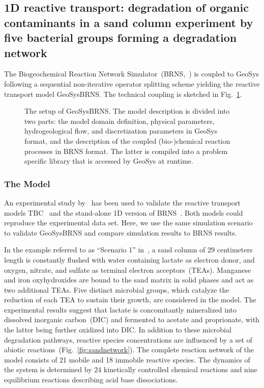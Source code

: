 \subsection[Degradation network (1D)]{1D reactive transport: degradation of organic contaminants in a
sand column experiment by five bacterial groups forming a degradation network}
\label{l_s_benchmark_1d_network}


The Biogeochemical Reaction Network
Simulator~(BRNS,~\cite{Aguilera2005,Regnier2002}) is coupled to GeoSys
following a sequential non-iterative operator splitting scheme yielding the
reactive transport model GeoSysBRNS. The technical
coupling is sketched in Fig.~\ref{fig:GeoSysBRNSSetup}.

\begin{figure}[h!]
\centering
{}
\caption{
The setup of GeoSysBRNS. The model description is divided into two parts: the
model domain definition, physical parameters, hydrogeological flow, and
discretization parameters in GeoSys format, and the description of the coupled
(bio-)chemical reaction processes in BRNS format. The latter is compiled into a
problem specific library that is accessed by GeoSys at runtime.
}
\label{fig:GeoSysBRNSSetup}
\end{figure}

\subsubsection*{The Model}

An experimental study by~\cite{Gunten1993} has been used to validate the
reactive transport models TBC~\cite{Schaefer1998b} and the stand-alone 1D
version of BRNS~\cite{Thullner2005}.  Both models could reproduce the
experimental data set. Here, we use the same simulation scenario to validate
GeoSysBRNS and compare simulation results to BRNS results.

In the example referred to as ``Scenario 1'' in~\cite{Thullner2005}, a sand
column of 29 centimeters length is constantly flushed with water containing
lactate as electron donor, and oxygen, nitrate, and sulfate as terminal
electron acceptors~(TEAs). Manganese and iron oxyhydroxides are bound to the
sand matrix in solid phases and act as two additional TEAs. Five distinct
microbial groups, which catalyze the reduction of each TEA to sustain their
growth, are considered in the model. The experimental results suggest that
lactate is concomitantly mineralized into dissolved inorganic carbon~(DIC) and
fermented to acetate and proprionate, with the latter being further oxidized
into DIC.  In addition to these microbial degradation pathways, reactive
species concentrations are influenced by a set of abiotic
reactions~(Fig.~\ref{fig:sandnetwork}).  The complete reaction network of the
model consists of 21 mobile and 18 immobile reactive species. The dynamics of
the system is determined by 24 kinetically controlled chemical reactions and
nine equilibrium reactions describing acid base dissociations.

